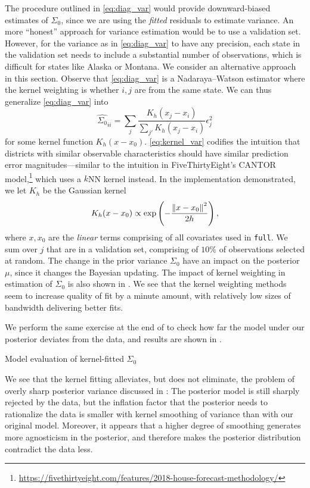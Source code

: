 \documentclass[12pt]{article}
\begin{document}
The procedure outlined in \eqref{eq:diag_var} would provide downward-biased estimates of $\Sigma_0$, since we are using the \emph{fitted} residuals to estimate variance. An more ``honest'' \citep{athey2016recursive} approach for variance estimation would be to use a validation set. However, for the variance as in \eqref{eq:diag_var} to have any precision, each state in the validation set needs to include a substantial number of observations, which is difficult for states like Alaska or Montana. We consider an alternative approach in this section. Observe that \eqref{eq:diag_var} is a Nadaraya--Watson estimator where the kernel weighting is whether $i,j$ are from the same state. We can thus generalize \eqref{eq:diag_var} into 
\begin{equation}
  \hat {\Sigma_0}_{ii} = \sum_j \frac{K_h(x_j - x_i)}{\sum_{j'} K_h(x_j - x_i)}\epsilon_j^2
\label{eq:kernel_var}
\end{equation}
for some kernel function $K_h(x-x_0)$. \eqref{eq:kernel_var} codifies the
intuition that districts with similar observable characteristics should have
similar prediction error magnitudes---similar to the intuition in FiveThirtyEight's
CANTOR model,\footnote{\url{https://fivethirtyeight.com/features/2018-house-forecast-methodology/}}
which uses a $k$NN kernel instead. In the implementation demonstrated, we let
$K_h$ be the Gaussian kernel \[K_h(x-x_0) \propto
\exp\left({-\frac{\left\lVert x-x_0\right\rVert^2}{2h}}\right),\] where $x, x_0$ are the \emph{linear}
terms comprising of all covariates used in \texttt{full}. We sum over $j$ that
are in a validation set, comprising of $10\%$ of observations selected at
random. The change in the prior variance $\Sigma_0$ have an impact on the
posterior $\mu$, since it changes the Bayesian updating. The impact of kernel
weighting in estimation of $\Sigma_0$ is also shown in . We
see that the kernel weighting methods seem to increase quality of fit by a
minute amount, with relatively low sizes of bandwidth delivering better fits. 

We perform the same exercise at the end of  to check how far
the model under our posterior deviates from the data, and results are shown in .
\begin{table}[tb]
  \caption{Model evaluation of kernel-fitted $\Sigma_0$}
  \label{tab:kernel_res}
  \centering
  \vspace{.4em}
  
\end{table}
We see
that the kernel fitting alleviates, but does not eliminate, the problem of
overly sharp posterior variance discussed in : The posterior
model is still sharply rejected by the data, but the inflation factor that the posterior
needs to rationalize the data is smaller with kernel smoothing of variance than
with our original model. Moreover, it appears that a higher degree of smoothing generates more agnosticism in the posterior, and therefore makes the posterior distribution contradict the data less. 
\end{document}
